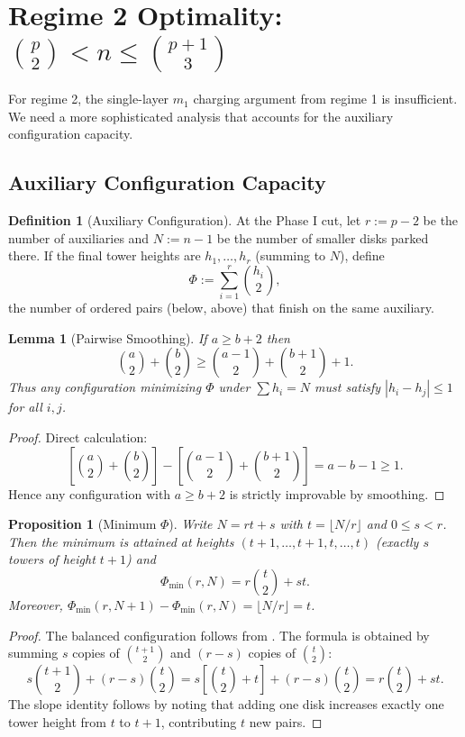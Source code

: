 \documentclass[11pt]{article}
\newtheorem{lemma}[theorem]{Lemma}
\newtheorem{proposition}[theorem]{Proposition}
\theoremstyle{definition}
\newtheorem{definition}{Definition}
\begin{document}
\section{Regime 2 Optimality: $\binom{p}{2} < n \leq \binom{p+1}{3}$}

For regime 2, the single-layer $m_1$ charging argument from regime 1 is insufficient. We need a more sophisticated analysis that accounts for the auxiliary configuration capacity.

\subsection{Auxiliary Configuration Capacity}

\begin{definition}[Auxiliary Configuration]
At the Phase I cut, let $r := p-2$ be the number of auxiliaries and $N := n-1$ be the number of smaller disks parked there. If the final tower heights are $h_1, \dots, h_r$ (summing to $N$), define
\[
\Phi := \sum_{i=1}^{r} \binom{h_i}{2},
\]
the number of ordered pairs (below, above) that finish on the same auxiliary.
\end{definition}

\begin{lemma}[Pairwise Smoothing]\label{lem:smoothing}
If $a \geq b+2$ then
\[
\binom{a}{2} + \binom{b}{2} \geq \binom{a-1}{2} + \binom{b+1}{2} + 1.
\]
Thus any configuration minimizing $\Phi$ under $\sum h_i = N$ must satisfy $|h_i - h_j| \leq 1$ for all $i,j$.
\end{lemma}

\begin{proof}
Direct calculation:
\[
\left[\binom{a}{2} + \binom{b}{2}\right] - \left[\binom{a-1}{2} + \binom{b+1}{2}\right] = a - b - 1 \geq 1.
\]
Hence any configuration with $a \geq b+2$ is strictly improvable by smoothing.
\end{proof}

\begin{proposition}[Minimum $\Phi$]\label{prop:phi-min}
Write $N = rt + s$ with $t = \lfloor N/r \rfloor$ and $0 \leq s < r$. Then the minimum is attained at heights $(t+1, \dots, t+1, t, \dots, t)$ (exactly $s$ towers of height $t+1$) and
\[
\Phi_{\min}(r,N) = r\binom{t}{2} + st.
\]
Moreover, $\Phi_{\min}(r,N+1) - \Phi_{\min}(r,N) = \lfloor N/r \rfloor = t$.
\end{proposition}

\begin{proof}
The balanced configuration follows from . The formula is obtained by summing $s$ copies of $\binom{t+1}{2}$ and $(r-s)$ copies of $\binom{t}{2}$:
\[
s\binom{t+1}{2} + (r-s)\binom{t}{2} = s\left[\binom{t}{2} + t\right] + (r-s)\binom{t}{2} = r\binom{t}{2} + st.
\]
The slope identity follows by noting that adding one disk increases exactly one tower height from $t$ to $t+1$, contributing $t$ new pairs.
\end{proof}
\end{document}
